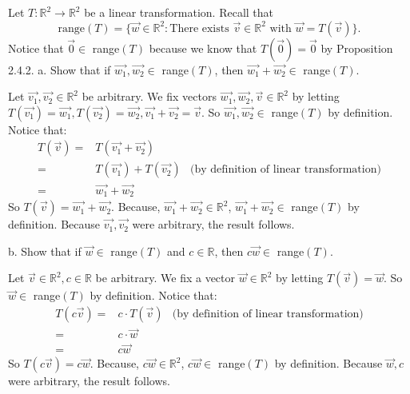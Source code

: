 \documentclass[12pt]{article}
\newenvironment{problem}[2][Problem]
{
	\begin{trivlist} 
		\item[\hskip \labelsep {\bfseries #1 #2:}]
	}
{
	\end{trivlist}
	}
\newenvironment{solution}[1][Solution]
{
	\begin{trivlist} 
		\item[\hskip \labelsep {\itshape #1:}]
	}
	{
	\end{trivlist}
}
\begin{document}
\newpage
\begin{problem}{2}
Let $T : \mathbb{R}^2 \to \mathbb{R}^2$ be a linear transformation. Recall that
\[
\text{range}(T) = \{ \vec{w} \in \mathbb{R}^2 : \text{There exists } \vec{v} \in \mathbb{R}^2 \text{ with } \vec{w} = T( \vec{v} ) \} \text{.}
\]
Notice that $\vec{0} \in$ range$(T)$ because we know that $T( \vec{0} ) = \vec{0}$ by Proposition 2.4.2.
\noindent
\newline
\newline
a. Show that if $\vec{w_{1}}, \vec{w_{2}} \in$ range$(T)$, then $\vec{w_{1}} + \vec{w_{2}} \in$ range$(T)$.
\begin{solution}
Let $\vec{v_{1}}, \vec{v_{2}} \in \mathbb{R}^2$ be arbitrary. We fix vectors $\vec{w_{1}}, \vec{w_{2}}, \vec{v} \in \mathbb{R}^2$ by letting $T(\vec{v_{1}})=\vec{w_{1}}, T(\vec{v_{2}})=\vec{w_{2}},\vec{v_{1}}+ \vec{v_{2}}=\vec{v}$. So $\vec{w_{1}}, \vec{w_{2}} \in$ range$(T)$ by definition. Notice that:
\begin{align*}
T(\vec{v})=&T(\vec{v_{1}}+ \vec{v_{2}}) &\\
=&T(\vec{v_{1}})+T(\vec{v_{2}}) & \text{(by definition of linear transformation)}\\
=&\vec{w_{1}} + \vec{w_{2}} & 
\end{align*}
So $T(\vec{v})=\vec{w_{1}} + \vec{w_{2}}$. Because, $\vec{w_{1}} + \vec{w_{2}} \in \mathbb{R}^2$, $\vec{w_{1}} + \vec{w_{2}} \in$ range$(T)$ by definition. Because $\vec{v_{1}}, \vec{v_{2}}$ were arbitrary, the result follows.
\end{solution}
\noindent
\newline
\newline
b. Show that if $\vec{w} \in$ range$(T)$ and $c \in \mathbb{R}$, then $c \vec{w} \in$ range$(T)$.
\begin{solution}
Let $\vec{v} \in \mathbb{R}^2, c \in \mathbb{R}$ be arbitrary. We fix a vector $\vec{w} \in \mathbb{R}^2$ by letting $T(\vec{v})=\vec{w}$. So $\vec{w} \in$ range$(T)$ by definition. Notice that:
\begin{align*}
T(c\vec{v})=& c \cdot T(\vec{v}) &\text{(by definition of linear transformation)}\\
=&c \cdot \vec{w} & \\
=&c\vec{w} & 
\end{align*}
So $T(c \vec{v})=c\vec{w}$. Because, $c\vec{w} \in \mathbb{R}^2$, $c\vec{w} \in$ range$(T)$ by definition. Because $\vec{w},c$ were arbitrary, the result follows.
\end{solution}
\end{problem}
\end{document}
